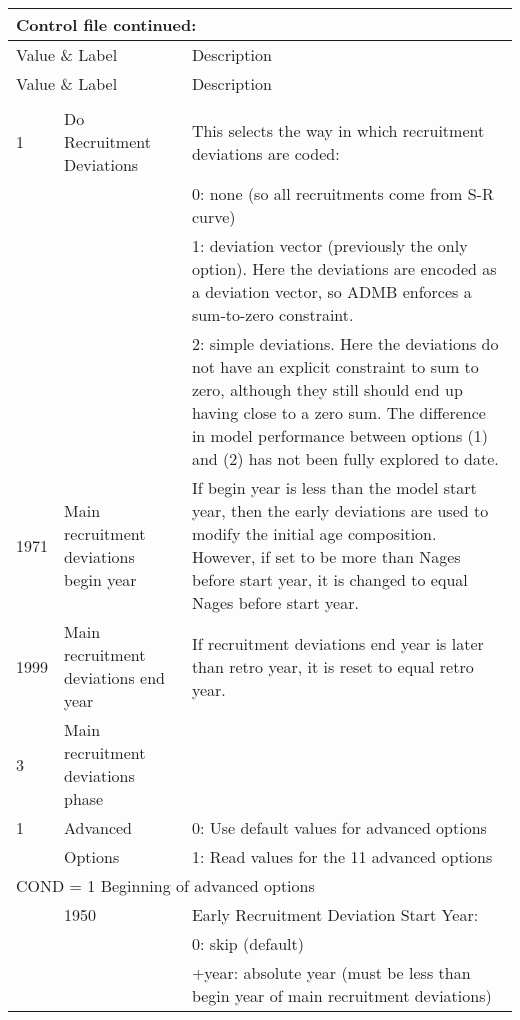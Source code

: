 \begin{center}
\begin{longtable}{p{1cm} p{3cm} p{11cm}}
	\multicolumn{3}{l}{Control file continued:}\\
	\hline
	\multicolumn{2}{l}{Value \& Label} &  Description\\
	\hline
	\endfirsthead
	
	\hline
	\multicolumn{2}{l}{Value \& Label} &  Description\\
	\hline
	\endhead
	
	\endfoot
	\endlastfoot
		\multicolumn{3}{l}{Then read additional spawner-recruitment conditions:}\\
		\hline
		1 & Do Recruitment Deviations & This selects the way in which recruitment deviations are coded:\\
		  &  & 0:  none (so all recruitments come from S-R curve)\\
		  &  & 1:  deviation vector (previously the only option).  Here the deviations are encoded as a deviation vector, so ADMB enforces a sum-to-zero constraint.\\
		  &  & 2:  simple deviations.  Here the deviations do not have an explicit constraint to sum to zero, although they still should end up having close to a zero sum.  The difference in model performance between options (1) and (2) has not been fully explored to date.\\
		\hline
		1971 & Main recruitment deviations begin year & If begin year is less than the model start year, then the early deviations are used to modify the initial age composition.   However, if set to be more than Nages before start year, it is changed to equal Nages before start year. \\
		\hline
		1999 & Main recruitment deviations end year & If recruitment deviations end year is later than retro year, it is reset to equal retro year. \\
		\hline
		3    & Main recruitment deviations phase & \\
		\hline
		1 & Advanced  & 0: Use default values for advanced options \\
		  & Options  & 1: Read values for the 11 advanced options \\
		\hline
		\multicolumn{3}{l}{COND = 1 Beginning of advanced options}\\
		& 1950 & Early Recruitment Deviation Start Year: \\
		&  & 0: skip (default) \\
		&  & +year:  absolute year (must be less than begin year of main recruitment deviations)\\

\end{longtable}
\end{center}
